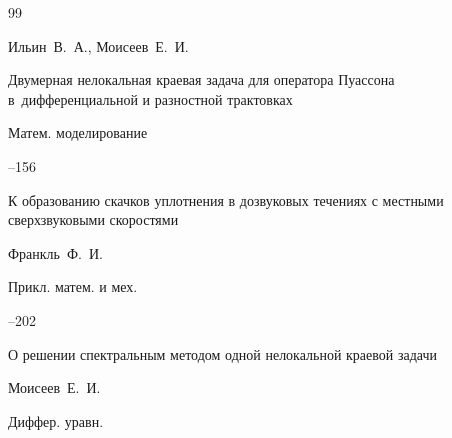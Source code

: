 \begin{thebibliography}{99}














\by Ильин~В.~А., Моисеев~Е.~И.

\paper Двумерная нелокальная краевая задача для оператора Пуассона в~дифференциальной и разностной трактовках

\jour Матем. моделирование




--156









\paper К образованию скачков уплотнения в дозвуковых течениях с местными сверхзвуковыми скоростями

\by Франкль~Ф.~И.

\jour Прикл. матем. и мех.




--202





\paper О решении спектральным методом одной нелокальной краевой задачи

\by Моисеев~Е.~И.

\jour Диффер. уравн.



\end{thebibliography}
